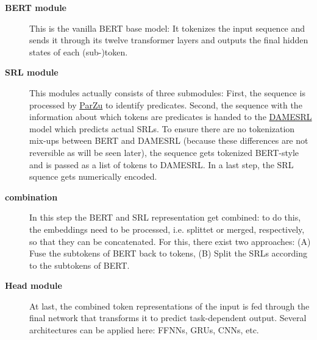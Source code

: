 \begin{description}
	\item[\textbf{BERT module}] This is the vanilla BERT base model: It tokenizes the input sequence and sends it through its twelve transformer layers and outputs the final hidden states of each (sub-)token.
  \item[\textbf{SRL module}] This modules actually consists of three submodules: First, the sequence is processed by \href{https://github.com/rsennrich/ParZu}{ParZu} \citep{sennrich2009new} to identify predicates.
	Second, the sequence with the information about which tokens are predicates is handed to the \href{https://liir.cs.kuleuven.be/software_pages/damesrl.php}{DAMESRL} model \citep{do2018flexible} which predicts actual SRLs.
	To ensure there are no tokenization mix-ups between BERT and DAMESRL (because these differences are not reversible as will be seen later), the sequence gets tokenized BERT-style and is passed as a list of tokens to DAMESRL. In a last step,
	the SRL squence gets numerically encoded.
  \item[\textbf{combination}] In this step the BERT and SRL representation get combined: to do this, the embeddings need to be processed, i.e. splittet or merged, respectively, so that they can be concatenated.
	For this, there exist two approaches:
	(A) Fuse the subtokens of BERT back to tokens, (B) Split the SRLs according to the subtokens of BERT.
  \item[\textbf{Head module}] At last, the combined token representations of the input is fed through the final network that transforms it to predict task-dependent output. Several architectures can be applied here: FFNNs, GRUs, CNNs, etc.
\end{description}

\begin{landscape}\centering
\end{landscape}



